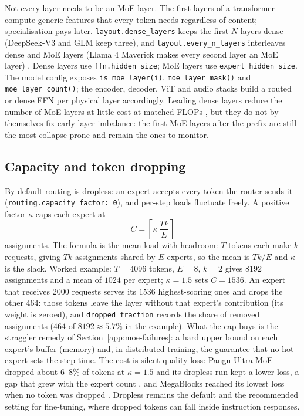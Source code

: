 Not every layer needs to be an MoE layer. The first layers of a transformer
compute generic features that every token needs regardless of content;
specialisation pays later. \texttt{layout.dense\_layers} keeps the first $N$
layers dense (DeepSeek-V3 and GLM keep three), and
\texttt{layout.every\_n\_layers} interleaves dense and MoE layers (Llama 4
Maverick makes every second layer an MoE layer)
\citep{deepseek2024v3,meta2025llama4}. Dense layers use
\texttt{ffn.hidden\_size}; MoE layers use \texttt{expert\_hidden\_size}. The
model config exposes \texttt{is\_moe\_layer(i)}, \texttt{moe\_layer\_mask()}
and \texttt{moe\_layer\_count()}; the encoder, decoder, ViT and audio stacks
build a routed or dense FFN per physical layer accordingly. Leading dense
layers reduce the number of MoE layers at little cost at matched FLOPs
\citep{krajewski2025scaling}, but they do not by themselves fix early-layer
imbalance: the first MoE layers after the prefix are still the most
collapse-prone and remain the ones to monitor.

\subsection{Capacity and token dropping}
\label{app:moe-capacity}

By default routing is dropless: an expert accepts every token the router
sends it (\texttt{routing.capacity\_factor: 0}), and per-step loads fluctuate
freely. A positive factor $\kappa$ caps each expert at
\begin{equation}
  C = \left\lceil \kappa\,\frac{Tk}{E} \right\rceil
\end{equation}
assignments. The formula is the mean load with headroom: $T$ tokens each make
$k$ requests, giving $Tk$ assignments shared by $E$ experts, so the mean is
$Tk/E$ and $\kappa$ is the slack. Worked example: $T = 4096$ tokens, $E = 8$,
$k = 2$ gives $8192$ assignments and a mean of $1024$ per expert; $\kappa =
1.5$ sets $C = 1536$. An expert that receives $2000$ requests serves its
$1536$ highest-scoring ones and drops the other $464$: those tokens leave
the layer without that expert's contribution (its weight is zeroed), and
\texttt{dropped\_fraction} records the share of removed assignments ($464$
of $8192 \approx 5.7\%$ in the example). What the cap buys is the straggler
remedy of Section~\ref{app:moe-failures}: a hard upper bound on each
expert's buffer (memory) and, in distributed training, the guarantee that no
hot expert sets the step time. The cost is silent quality loss: Pangu Ultra
MoE dropped about 6--8\% of tokens at $\kappa = 1.5$ and its dropless run
kept a lower loss, a gap that grew with the expert count
\citep{pangu2025ultra}, and MegaBlocks reached its lowest loss when no token
was dropped \citep{gale2022megablocks}. Dropless remains the default and the
recommended setting for fine-tuning, where dropped tokens can fall inside
instruction responses.

